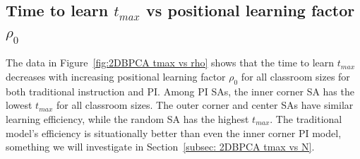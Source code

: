 \subsection{Time to learn $t_{max}$ vs positional learning factor $\rho_0$} \label{subsec: 2DBPCA tmax vs rho}

The data in Figure~\ref{fig:2DBPCA tmax vs rho} shows that the time to learn $t_{max}$ decreases with increasing positional learning factor $\rho_0$ for all classroom sizes for both traditional instruction and PI. 
Among PI SAs, the inner corner SA has the lowest $t_{max}$ for all classroom sizes. 
The outer corner and center SAs have similar learning efficiency, while the random SA has the highest $t_{max}$. 
The traditional model's efficiency is situationally better than even the inner corner PI model, something we will investigate in Section~\ref{subsec: 2DBPCA tmax vs N}.

